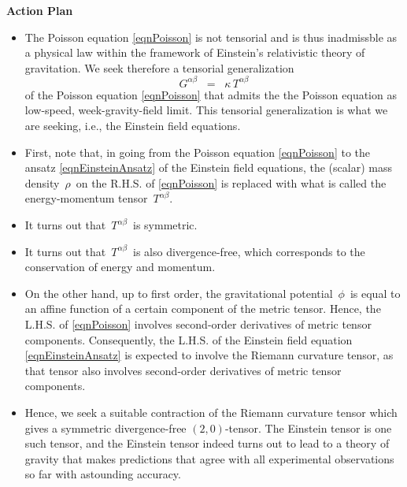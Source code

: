 \vskip 0.3cm
\noindent
\textbf{Action Plan}
\begin{itemize}
\item
	The Poisson equation \eqref{eqnPoisson} is not tensorial and is thus inadmissble
	as a physical law within the framework of Einstein's relativistic theory of gravitation.
	We seek therefore a tensorial generalization
	\begin{equation}\label{eqnEinsteinAnsatz}
	G^{\alpha\beta} \;\; = \;\; \kappa\,T^{\alpha\beta}
	\end{equation}
	of the Poisson equation \eqref{eqnPoisson} that admits the the Poisson equation
	as low-speed, week-gravity-field limit.
	This tensorial generalization is what we are seeking, i.e.,
	the Einstein field equations.
\item
	First, note that, in going
	from the Poisson equation \eqref{eqnPoisson}
	to the ansatz \eqref{eqnEinsteinAnsatz} of the Einstein field equations,
	the (scalar) mass density \,$\rho$\, on the R.H.S. of \eqref{eqnPoisson}
	is replaced with what is called the energy-momentum tensor \,$T^{\alpha\beta}$.
\item
	It turns out that \,$T^{\alpha\beta}$\, is symmetric.
\item
	It turns out that \,$T^{\alpha\beta}$\, is also divergence-free,
	which corresponds to the conservation of energy and momentum.
\item
	On the other hand, up to first order, the gravitational potential \,$\phi$\,
	is equal to an affine function of a certain component of the metric tensor.
	Hence, the L.H.S. of \eqref{eqnPoisson} involves second-order derivatives of metric tensor components.
	Consequently, the L.H.S. of the Einstein field equation \eqref{eqnEinsteinAnsatz} is expected to involve
	the Riemann curvature tensor, as that tensor also involves second-order derivatives of metric tensor components.
\item
	Hence, we seek a suitable contraction of the Riemann curvature tensor
	which gives a symmetric divergence-free $(2,0)$-tensor.
	The Einstein tensor is one such tensor, and the Einstein tensor
	indeed turns out to lead to a theory of gravity that makes predictions that agree
	with all experimental observations so far with astounding accuracy.
\end{itemize}


\vskip 0.3cm
\noindent




